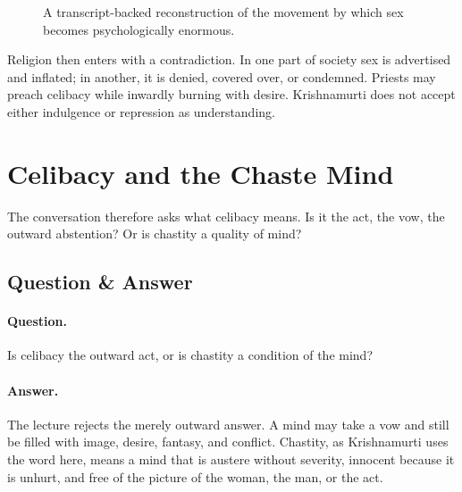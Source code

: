 \begin{figure}
\centering
{}
\caption{A transcript-backed reconstruction of the movement by which sex becomes psychologically enormous.}
\end{figure}

Religion then enters with a contradiction. In one part of society sex is advertised and inflated; in another, it is denied, covered over, or condemned. Priests may preach celibacy while inwardly burning with desire. Krishnamurti does not accept either indulgence or repression as understanding.

\section{Celibacy and the Chaste Mind}

The conversation therefore asks what celibacy means. Is it the act, the vow, the outward abstention? Or is chastity a quality of mind?

\subsection{Question \& Answer}

\paragraph{Question.}
Is celibacy the outward act, or is chastity a condition of the mind?

\paragraph{Answer.}
The lecture rejects the merely outward answer. A mind may take a vow and still be filled with image, desire, fantasy, and conflict. Chastity, as Krishnamurti uses the word here, means a mind that is austere without severity, innocent because it is unhurt, and free of the picture of the woman, the man, or the act.

